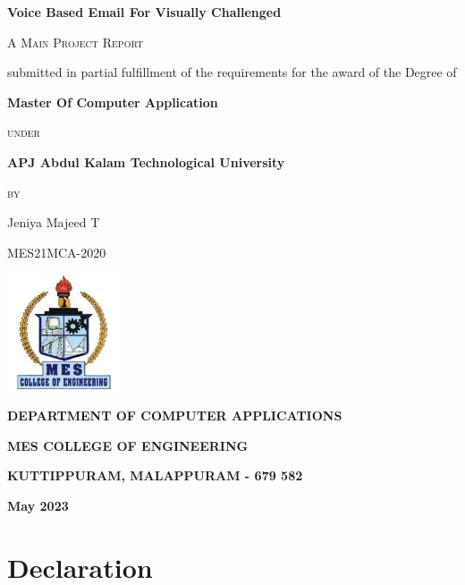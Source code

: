 \documentclass[12pt]{report}
\begin{document}
\begin{titlepage}
	\centering
	
	{\LARGE\bfseries{Voice Based Email For Visually Challenged } \par}
	\vspace{0.5cm}
	{\scshape\Large A Main Project Report\par}
	{\large submitted in partial fulfillment of the requirements
for the award of the Degree of \par}
	\vspace{1.25cm}
	{\large\bfseries Master Of Computer Application\par}
	{\scshape\large under \par}
	{\large\bfseries APJ Abdul Kalam Technological University \par}
	\vspace{1.25cm}
	{\scshape\large by \par}
	{\Large Jeniya Majeed T\par}
	{\Large MES21MCA-2020 \par}
	\vspace{1cm}
	
	\includegraphics[width=0.25\textwidth]{MESCE.jpg}\par\vspace{1cm}
	
	{\large\bfseries DEPARTMENT OF COMPUTER APPLICATIONS\par}
	{\large\bfseries MES COLLEGE OF ENGINEERING\par}
	{\small\bfseries KUTTIPPURAM, MALAPPURAM - 679 582\par}
	
	\vspace{0.4cm}
	
	{\large \bfseries May 2023 \par}
\end{titlepage}

\chapter*{Declaration}
\thispagestyle{empty}
\end{document}

